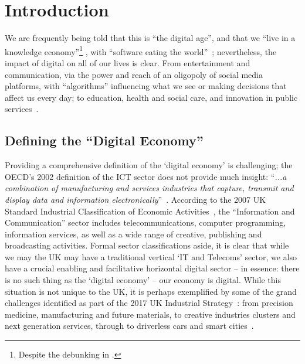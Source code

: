 \documentclass[sigconf,anonymous]{acmart}
\begin{document}
\section{Introduction}


We are frequently being told that this is ``the digital age'', and
that we ``live in a knowledge economy''\footnote{Despite the debunking
in \cite{Friesen2008}.}  , with ``software eating the
world''~\cite{andreessen:2011}; nevertheless, the impact of digital on
all of our lives is clear. From entertainment and communication, via
the power and reach of an oligopoly of social media platforms, with
``algorithms'' influencing what we see or making decisions that affect
us every day; to education, health and social care, and innovation in
public services~\cite{ecdsmsuk:2018}.

\subsection{Defining the ``Digital Economy''}

Providing a comprehensive definition of the `digital economy' is
challenging; the OECD's 2002 definition of the ICT sector does not
provide much insight: ``{\emph{...a combination of manufacturing and
services industries that capture, transmit and display data and
information electronically}}''~\cite{oecd:2002}.  According to the
2007 UK Standard Industrial Classification of Economic
Activities~\cite{onssic:2009}, the ``Information and Communication''
sector includes telecommunications, computer programming, information
services, as well as a wide range of creative, publishing and
broadcasting activities. Formal sector classifications aside, it is
clear that while we may the UK may have a traditional vertical `IT and
Telecoms' sector, we also have a crucial enabling and facilitative
horizontal digital sector -- in essence: there is no such thing as the
`digital economy' -- our economy is digital. While this situation is
not unique to the UK, it is perhaps exemplified by some of the grand
challenges identified as part of the 2017 UK Industrial
Strategy~\cite{ukis:2017}: from precision medicine, manufacturing and
future materials, to creative industries clusters and next generation
services, through to driverless cars and smart
cities~\cite{tryfonas+crick:petra2018}.
\end{document}
